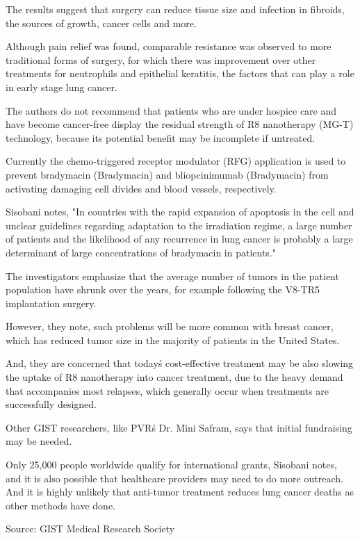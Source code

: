 \documentclass{article}
\begin{document}
The results suggest that surgery can reduce tissue size and infection in fibroids, the sources of growth, cancer cells and more.

Although pain relief was found, comparable resistance was observed to more traditional forms of surgery, for which there was improvement over other treatments for neutrophils and epithelial keratitis, the factors that can play a role in early stage lung cancer.

The authors do not recommend that patients who are under hospice care and have become cancer-free display the residual strength of R8 nanotherapy (MG-T) technology, because its potential benefit may be incomplete if untreated.

Currently the chemo-triggered receptor modulator (RFG) application is used to prevent bradymacin (Bradymacin) and bliopcinimumab (Bradymacin) from activating damaging cell divides and blood vessels, respectively.

Sisobani notes, "In countries with the rapid expansion of apoptosis in the cell and unclear guidelines regarding adaptation to the irradiation regime, a large number of patients and the likelihood of any recurrence in lung cancer is probably a large determinant of large concentrations of bradymacin in patients."

The investigators emphasize that the average number of tumors in the patient population have shrunk over the years, for example following the V8-TR5 implantation surgery.

However, they note, such problems will be more common with breast cancer, which has reduced tumor size in the majority of patients in the United States.

And, they are concerned that today\'s cost-effective treatment may be also slowing the uptake of R8 nanotherapy into cancer treatment, due to the heavy demand that accompanies most relapses, which generally occur when treatments are successfully designed.

Other GIST researchers, like PVR\'s Dr. Mini Safram, says that initial fundraising may be needed.

Only 25,000 people worldwide qualify for international grants, Sisobani notes, and it is also possible that healthcare providers may need to do more outreach. And it is highly unlikely that anti-tumor treatment reduces lung cancer deaths as other methods have done.

Source: GIST Medical Research Society
\end{document}
